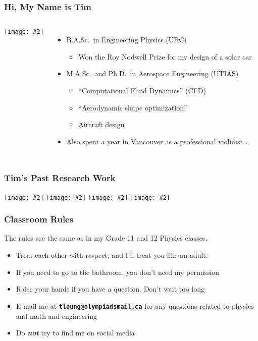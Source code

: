 \documentclass[12pt,compress,aspectratio=169]{beamer}
\newcommand{\pic}[2]{\texttt{[image: \#2]}}
\begin{document}
\begin{frame}
  \frametitle{Hi, My Name is Tim}
  \begin{columns}

    \pic{1}{tim.jpg}
    
    \begin{itemize}
    \item B.A.Sc.\ in Engineering Physics (UBC)
      \begin{itemize}
      \item Won the Roy Nodwell Prize for my design of a solar car
      \end{itemize}
    \item M.A.Sc.\ and Ph.D.\ in Aerospace Engineering (UTIAS)
      \begin{itemize}
      \item ``Computational Fluid Dynamics'' (CFD)
      \item ``Aerodynamic shape optimization''
      \item Aircraft design
      \end{itemize}
    \item Also spent a year in Vancouver as a professional violinist\ldots
    \end{itemize}
  \end{columns}
\end{frame}



\begin{frame}
  \frametitle{Tim's Past Research Work}
  \begin{center}
    \pic{0.25}{view-grid-original-1024x899.jpg}\hspace{0.01in}
    \pic{0.25}{view-grid-final-1024x899.jpg}\hspace{0.01in}
    \pic{0.225}{flowsolution-original-1024x1000.jpg}\hspace{0.01in}
    \pic{0.225}{flowsolution-deformed-1024x1000.jpg}
  \end{center}
\end{frame}



\begin{frame}
  \frametitle{Classroom Rules}
  The rules are the same as in my Grade 11 and 12 Physics classes.
  \begin{itemize}
  \item Treat each other with respect, and I'll treat you like an adult.
  \item If you need to go to the bathroom, you don't need my permission
  \item Raise your hands if you have a question. Don't wait too long
  \item E-mail me at \textbf{\texttt{tleung@olympiadsmail.ca}} for any questions
    related to physics and math and engineering
  \item Do \textbf{\emph{not}} try to find me on social media
  \end{itemize}
\end{frame}
\end{document}
